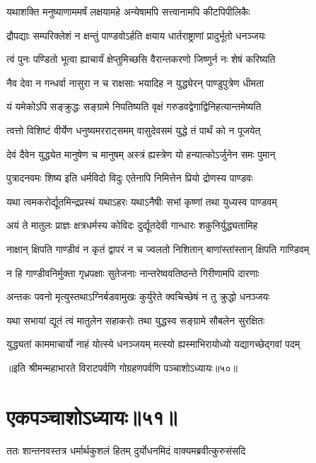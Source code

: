 \twolineshloka
{यथाशक्ति मनुष्याणाममर्षं लक्षयामहे}
{अन्येषामपि सत्त्वानामपि कीटपिपीलिकैः}


\twolineshloka
{द्रौपद्याः सम्परिक्लेशं न क्षन्तुं पाण्डवोऽर्हति}
{क्षयाय धार्तराष्ट्राणां प्रादुर्भूतो धनञ्जयः}


\twolineshloka
{त्वं पुनः पण्डितो भूत्वा ह्याचार्यं क्षेप्तुमिच्छसि}
{वैरान्तकरणो जिष्णुर्न नः शेषं करिष्यति}


\twolineshloka
{नैव देवा न गन्धर्वा नासुरा न च राक्षसाः}
{भयादिह न युद्ध्येरन् पाण्डुपुत्रेण धीमता}


\twolineshloka
{यं यमेकोऽपि सङ्क्रुद्धः सङ्ग्रामे निपतिष्यति}
{वृक्षं गरुडवद्वेगाद्विनिहत्यान्तमेष्यति}


\twolineshloka
{त्वत्तो विशिष्टं वीर्येण धनुष्यमरराट्समम्}
{वासुदेवसमं युद्धे तं पार्थं को न पूजयेत्}


\twolineshloka
{देवं दैवेन युद्ध्येत मानुषेण च मानुषम्}
{अस्त्रं ह्यस्त्रेण यो हन्यात्कोऽर्जुनेन समः पुमान्}


\twolineshloka
{पुत्रादनवमः शिष्य इति धर्मविदो विदुः}
{एतेनापि निमित्तेन प्रियो द्रोणस्य पाण्डवः}


\twolineshloka
{यथा त्वमकरोर्द्यूतमिन्द्रप्रस्थं यथाऽहरः}
{यथाऽनैषीः सभां कृष्णां तथा युध्यस्व पाण्डवम्}


\twolineshloka
{अयं ते मातुलः प्राज्ञः क्षत्रधर्मस्य कोविदः}
{दुर्द्यूतदेवी गान्धारः शकुनिर्युद्ध्यतामिह}


\twolineshloka
{नाक्षान् क्षिपति गाण्डीवं न कृतं द्वापरं न च}
{ज्वलतो निशितान् बाणांस्तांस्तान् क्षिपति गाण्डिवम्}


\twolineshloka
{न हि गाण्डीवनिर्मुक्ता गृध्रपक्षाः सुतेजनाः}
{नान्तरेष्ववतिष्ठन्ते गिरीणामपि दारणाः}


\twolineshloka
{अन्तकः पवनो मृत्युस्तथाऽग्निर्बडवामुखः}
{कुर्युरेते क्वचिच्छेषं न तु क्रुद्धो धनञ्जयः}


\twolineshloka
{यथा सभायां द्यूतं त्वं मातुलेन सहाकरोः}
{तथा युद्धस्व सङ्ग्रामे सौबलेन सुरक्षितः}


\twolineshloka
{युद्ध्यतां काममाचार्यो नाहं योत्स्ये धनञ्जयम्}
{मत्स्यो ह्यस्माभिरायोध्यो यद्यागच्छेद्गवां पदम्}

॥इति श्रीमन्महाभारते विराटपर्वणि गोग्रहणपर्वणि पञ्चाशोऽध्यायः॥५०॥

\chapter{एकपञ्चाशोऽध्यायः॥५१॥}

\twolineshloka
{ततः शान्तनवस्तत्र धर्मार्थकुशलं हितम्}
{दुर्योधनमिदं वाक्यमब्रवीत्कुरुसंसदि}


